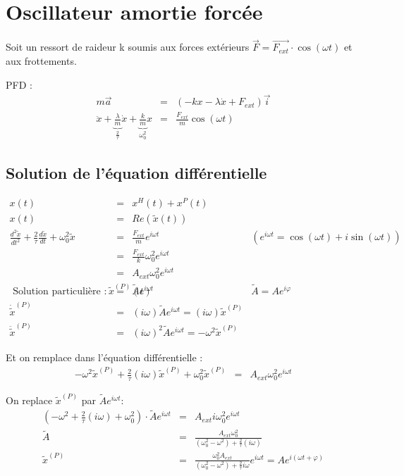 \section{Oscillateur amortie forcée}

Soit un ressort de raideur k soumis aux forces extérieurs $\vec{F} = \vec{F_{ext}}\cdot \cos(\omega t)$ et aux frottements.

PFD :
\[\begin{array}{rcl}
	m\vec{a} &=& (-kx -\lambda \dot{x} + F_{ext})\vec{i} \\
	\ddot{x} + \underbrace{\frac{\lambda}{m}}_{\frac{2}{\tau}}\dot{x} + \underbrace{\frac{k}{m}}_{\omega_0^2} x &=& \frac{F_{ext}}{m} \cos(\omega t)
\end{array}\]

\subsection{Solution de l'équation différentielle}

\[\begin{array}{rclr}
	x(t) &=& x^H(t) + x^P(t) \\
	x(t) &=& Re(\tilde{x}(t)) \\
	\frac{d^2\tilde{x}}{dt^2} + \frac{2}{\tau}\frac{d\tilde{x}}{dt} + \omega_0^2 \tilde{x} &=& \frac{F_{ext}}{m} e^{i\omega t} & (e^{i\omega t} = \cos(\omega t) + i\sin(\omega t)) \\
	&=& \frac{F_{ext}}{k}\omega_0^2e^{i\omega t} \\
	&=& A_{ext}\omega_0^2 e^{i\omega t} \\
	\text{ Solution particulière : } \tilde{x}^{(P)}(t) &=& \tilde{A}e^{i\omega t} & \tilde{A} = Ae^{i\varphi} \\
	\dot{\tilde{x}}^{(P)} &=& (i\omega)\tilde{A}e^{i\omega t}  = (i\omega)\tilde{x}^{(P)} \\
	\ddot{\tilde{x}}^{(P)} &=& (i\omega)^2\tilde{A}e^{i\omega t} = -\omega^2\tilde{x}^{(P)}
\end{array}\]

Et on remplace dans l'équation différentielle : 
\[\begin{array}{rcl}
	-\omega^2\tilde{x}^{(P)} + \frac{2}{\tau}(i\omega)\tilde{x}^{(P)} + \omega_0^2\tilde{x}^{(P)} &=& A_{ext}\omega_0^2e^{i\omega t}
\end{array}\]

On replace $\tilde{x}^{(P)}$ par $\tilde{A}e^{i\omega t}$:
\[\begin{array}{rcl}
	(-\omega^2 + \frac{2}{\tau}(i\omega) + \omega_0^2)\cdot \tilde{A}e^{i\omega t} &=& A_{ext}i\omega_0^2 e^{i\omega t} \\
	\tilde{A} &=& \frac{A_{ext}\omega_0^2}{(\omega_0^2 - \omega^2)+ \frac{2}{\tau}(i\omega)} \\
	\tilde{x}^{(P)} &=& \frac{\omega_0^2A_{ext}}{(\omega_0^2 - \omega^2)+\frac{2}{\tau}i\omega}e^{i\omega t} = Ae^{i(\omega t + \varphi)}
\end{array}\]

